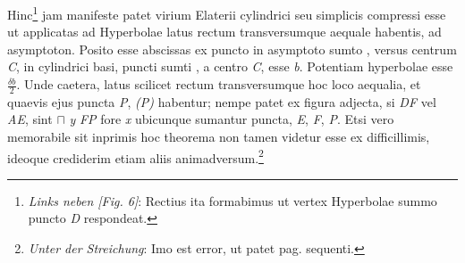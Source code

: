 \pend
\pstart \footnotesize Hinc\footnote{\textit{Links neben [Fig. 6]}: Rectius ita formabimus ut vertex Hyperbolae summo puncto \textit{D} respondeat.}  jam manifeste patet  virium Elaterii\protect{} cylindrici seu simplicis compressi esse ut applicatas ad Hyperbolae latus rectum transversumque aequale habentis, ad asymptoton. Posito   esse abscissas ex puncto in asymptoto sumto , versus centrum \textit{C}, in cylindrici basi,  puncti sumti , a centro \textit{C}, esse \textit{b}. Potentiam hyperbolae esse $\displaystyle \frac{\delta b}{2}$. Unde caetera, latus scilicet rectum transversumque hoc loco aequalia, et quaevis ejus puncta \textit{P}, \textit{(P)} habentur; nempe patet ex figura adjecta, si \textit{DF} vel \textit{AE}, sint $\sqcap$ \textit{y} \textit{FP} fore \textit{x} ubicunque sumantur puncta, \textit{E}, \textit{F}, \textit{P}.\pend 
\pstart \footnotesize Etsi vero memorabile sit inprimis hoc theorema non tamen videtur esse ex difficillimis, ideoque crediderim etiam aliis animadversum.\footnote{\textit{Unter der Streichung}: Imo est error, ut patet pag. sequenti.}
\pend 
